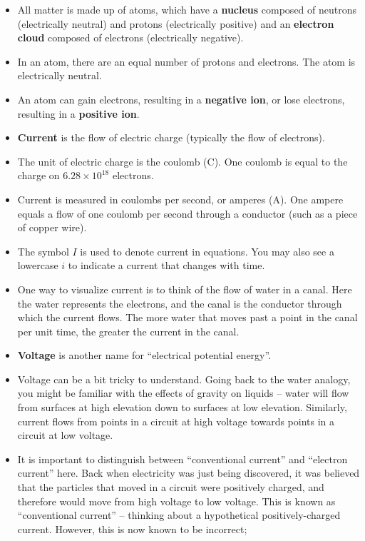 \documentclass[letterpaper,12pt]{scrartcl}
\begin{document}
\begin{itemize}
\item All matter is made up of atoms, which have a \textbf{nucleus} composed of neutrons (electrically neutral)
and protons (electrically positive) and an \textbf{electron cloud} composed of electrons (electrically negative).
\item In an atom, there are an equal number of protons and electrons. The atom is electrically neutral.
\item An atom can gain electrons, resulting in a \textbf{negative ion}, or lose electrons, resulting in a \textbf{positive ion}.
\item \textbf{Current} is the flow of electric charge (typically the flow of electrons).
\item The unit of electric charge is the coulomb (C). One coulomb is equal to the charge on $6.28 \times 10^{18}$ electrons.
\item Current is measured in coulombs per second, or amperes (A). One ampere equals a flow of one coulomb per second through a conductor
(such as a piece of copper wire).
\item The symbol $I$ is used to denote current in equations. You may also see a lowercase $i$ to indicate a current that changes with time.
\item One way to visualize current is to think of the flow of water in a canal. Here the water represents the electrons, and the canal is the conductor
through which the current flows. The more water that moves past a point in the canal per unit time, the greater the current in the canal.
\item \textbf{Voltage} is another name for ``electrical potential energy''.
\item Voltage can be a bit tricky to understand. Going back to the water analogy, you might be familiar with the effects of gravity on liquids --
water will flow from surfaces at high elevation down to surfaces at low elevation. Similarly, current flows from points in a circuit
at high voltage towards points in a circuit at low voltage.
\item It is important to distinguish between ``conventional current'' and ``electron current'' here.
Back when electricity was just being discovered, it was believed that the particles that moved in a circuit were positively charged, and therefore would
move from high voltage to low voltage. This is known as ``conventional current'' -- thinking about a hypothetical positively-charged current. 
However, this is now known to be incorrect;

\end{itemize}
\end{document}
